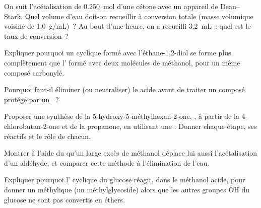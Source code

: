 \begin{exercise}[$\star\star$]\label{exo:b1:acetals-protection:7}
On suit l'acétalisation de \qty{0.250}{mol} d'une cétone avec un
appareil de Dean--Stark. Quel volume d'eau doit-on recueillir à
conversion totale (masse volumique voisine de \qty{1.0}{g/mL})~? Au bout
d'une heure, on a recueilli
\qty{3.2}{mL}~: quel est le taux de conversion~?
\end{exercise}

\begin{exercise}[$\star\star$]\label{exo:b1:acetals-protection:8}
Expliquer pourquoi un  cyclique formé avec l'éthane-1,2-diol se
forme plus complètement que l' formé avec deux molécules de
méthanol, pour un même composé carbonylé.
\end{exercise}

\begin{exercise}[$\star\star$]\label{exo:b1:acetals-protection:9}
Pourquoi faut-il éliminer (ou neutraliser) le  acide avant de
traiter un composé protégé par un ~?
\end{exercise}

\begin{exercise}[$\star\star\star$]\label{exo:b1:acetals-protection:10}
Proposer une synthèse de la 5-hydroxy-5-méthylhexan-2-one,
, à partir de la 4-chlorobutan-2-one et de la
propanone, en utilisant une . Donner chaque étape, ses
réactifs et le rôle de chacun.
\end{exercise}

\begin{exercise}[$\star\star\star$]\label{exo:b1:acetals-protection:11}
Montrer à l'aide du  qu'un large excès de méthanol
déplace lui aussi l'acétalisation d'un aldéhyde, et comparer cette
méthode à l'élimination de l'eau.
\end{exercise}

\begin{exercise}[$\star\star\star$]\label{exo:b1:acetals-protection:12}
Expliquer pourquoi l' cyclique du glucose réagit, dans le
méthanol acide, pour donner un  méthylique (un méthylglycoside)
alors que les autres groupes OH du glucose ne sont pas convertis en
éthers.
\end{exercise}

